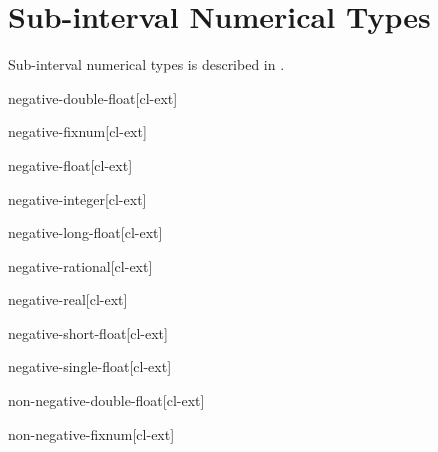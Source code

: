 \documentclass[10pt,english]{book}
\begin{document}
\section{Sub-interval Numerical Types}
\label{sec:sub-interv-numer}

Sub-interval numerical types is described in
\cite{antoniotti08:subinterval}.

\begin{type}{negative-double-float}{}[cl-ext]
  
\end{type}

\begin{type}{negative-fixnum}{}[cl-ext]
  
\end{type}

\begin{type}{negative-float}{}[cl-ext]
  
\end{type}

\begin{type}{negative-integer}{}[cl-ext]
  
\end{type}

\begin{type}{negative-long-float}{}[cl-ext]
  
\end{type}

\begin{type}{negative-rational}{}[cl-ext]
  
\end{type}

\begin{type}{negative-real}{}[cl-ext]
  
\end{type}

\begin{type}{negative-short-float}{}[cl-ext]
  
\end{type}

\begin{type}{negative-single-float}{}[cl-ext]
  
\end{type}

\begin{type}{non-negative-double-float}{}[cl-ext]
  
\end{type}

\begin{type}{non-negative-fixnum}{}[cl-ext]
  
\end{type}
\end{document}
